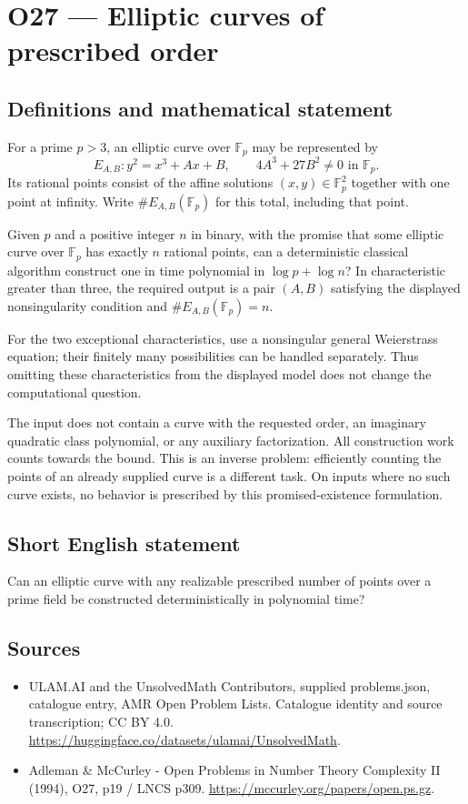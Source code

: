 \documentclass[11pt,a4paper]{article}
\begin{document}
\section*{O27 — Elliptic curves of prescribed order}\label{statement}

\subsection{Definitions and mathematical statement}
For a prime $p>3$, an elliptic curve over $\mathbb F_p$ may be represented by
\[
E_{A,B}:y^2=x^3+Ax+B,\qquad 4A^3+27B^2\ne0\text{ in }\mathbb F_p.
\]
Its rational points consist of the affine solutions $(x,y)\in\mathbb F_p^2$ together with one point at infinity. Write $\#E_{A,B}(\mathbb F_p)$ for this total, including that point.

Given $p$ and a positive integer $n$ in binary, with the promise that some elliptic curve over $\mathbb F_p$ has exactly $n$ rational points, can a deterministic classical algorithm construct one in time polynomial in $\log p+\log n$? In characteristic greater than three, the required output is a pair $(A,B)$ satisfying the displayed nonsingularity condition and $\#E_{A,B}(\mathbb F_p)=n$.

For the two exceptional characteristics, use a nonsingular general Weierstrass equation; their finitely many possibilities can be handled separately. Thus omitting these characteristics from the displayed model does not change the computational question.

The input does not contain a curve with the requested order, an imaginary quadratic class polynomial, or any auxiliary factorization. All construction work counts towards the bound. This is an inverse problem: efficiently counting the points of an already supplied curve is a different task. On inputs where no such curve exists, no behavior is prescribed by this promised-existence formulation.
\subsection{Short English statement}
Can an elliptic curve with any realizable prescribed number of points over a prime field be constructed deterministically in polynomial time?
\subsection{Sources}
\begin{itemize}
\item[S1] ULAM.AI and the UnsolvedMath Contributors, supplied problems.json, catalogue entry, AMR Open Problem Lists. Catalogue identity and source transcription; CC BY 4.0.
\url{https://huggingface.co/datasets/ulamai/UnsolvedMath}.
\item[S2] Adleman \& McCurley - Open Problems in Number Theory Complexity II (1994), O27, p19 / LNCS p309. 
\url{https://mccurley.org/papers/open.ps.gz}.
\end{itemize}
\end{document}
